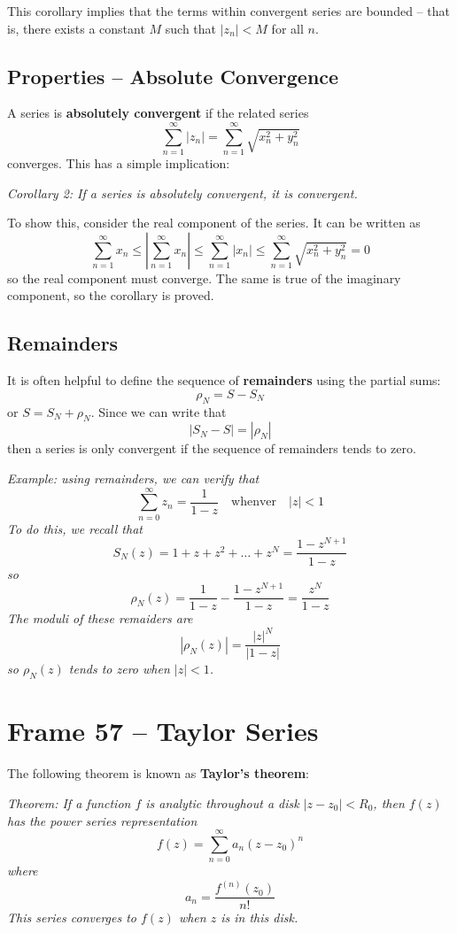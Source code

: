\documentclass{article}
\renewcommand{\emph}{\textbf}
\begin{document}
This corollary implies that the terms within convergent series are bounded -- that is, there exists a constant $M$ such that $|z_n| < M$ for all $n$.

\subsection{Properties -- Absolute Convergence}
A series is \emph{absolutely convergent} if the related series
\[
	\sum_{n=1}^\infty |z_n| = \sum_{n=1}^\infty \sqrt{x_n^2 + y_n^2}
\]
converges. This has a simple implication:

\textit{Corollary 2: If a series is absolutely convergent, it is convergent.}

To show this, consider the real component of the series. It can be written as
\[
	\sum_{n=1}^\infty x_n
	\le \left| \sum_{n=1}^\infty x_n \right|
	\le \sum_{n=1}^\infty |x_n|
	\le \sum_{n=1}^\infty \sqrt{x_n^2 + y_n^2}
	= 0
\]
so the real component must converge. The same is true of the imaginary component, so the corollary is proved.

\subsection{Remainders}
It is often helpful to define the sequence of \emph{remainders} using the partial sums:
\[
	\rho_N = S - S_N
\]
or $S = S_N + \rho_N$. Since we can write that
\[
	|S_N - S| = |\rho_N|
\]
then a series is only convergent if the sequence of remainders tends to zero.

\textit{Example: using remainders, we can verify that
\[
	\sum_{n=0}^\infty z_n = \frac{1}{1 - z} \quad \text{whenver} \quad |z| < 1
\]
To do this, we recall that
\[
	S_N(z) = 1 + z + z^2 + \dots + z^N = \frac{1 - z^{N+1}}{1 - z}
\]
so
\[
	\rho_N(z) = \frac{1}{1 - z} - \frac{1 - z^{N+1}}{1 - z}
	= \frac{z^N}{1 - z}
\]
The moduli of these remaiders are
\[
	|\rho_N(z)| = \frac{|z|^N}{|1 - z|}
\]
so $\rho_N(z)$ tends to zero when $|z| < 1$.}


\clearpage
\section{Frame 57 -- Taylor Series}
The following theorem is known as \emph{Taylor's theorem}:

\textit{Theorem: If a function $f$ is analytic throughout a disk $|z - z_0| < R_0$, then $f(z)$ has the power series representation
\[
	f(z) = \sum_{n = 0}^\infty a_n (z - z_0)^n
\]
where
\[
	a_n = \frac{f^{(n)} (z_0)}{n!}
\]
This series converges to $f(z)$ when $z$ is in this disk.}
\end{document}
